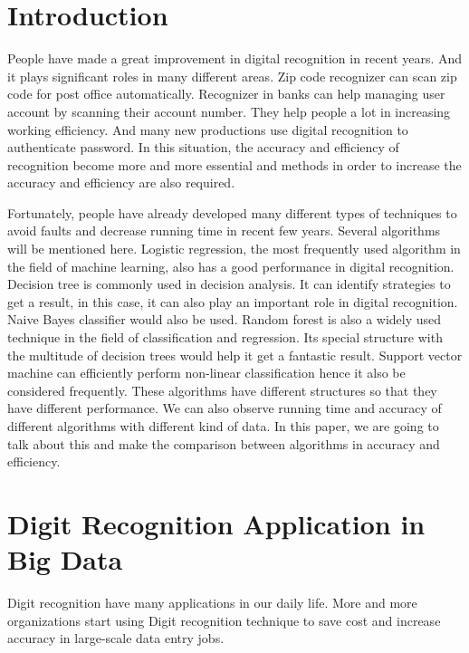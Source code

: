 \documentclass[sigconf]{acmart}
\begin{document}


\maketitle



\section{Introduction}

People have made a great improvement in digital recognition in recent years. And it plays significant roles in many different areas. Zip code recognizer can scan zip code for post office automatically. Recognizer in banks can help managing user account by scanning their account number. They help people a lot in increasing working efficiency. And many new productions use digital recognition to authenticate password. In this situation, the accuracy and efficiency of recognition become more and more essential and methods in order to increase the accuracy and efficiency are also required.

Fortunately, people have already developed many different types of techniques to avoid faults and decrease running time in recent few years. Several algorithms will be mentioned here. Logistic regression, the most frequently used algorithm in the field of machine learning, also has a good performance in digital recognition. Decision tree is commonly used in decision analysis. It can identify strategies to get a result, in this case, it can also play an important role in digital recognition. Naive Bayes classifier would also be used. Random forest is also a widely used technique in the field of classification and regression. Its special structure with the multitude of decision trees would help it get a fantastic result. Support vector machine can efficiently perform non-linear classification hence it also be considered frequently. These algorithms have different structures so that they have different performance. We can also observe running time and accuracy of different algorithms with different kind of data. In this paper, we are going to talk about this and make the comparison between algorithms in accuracy and efficiency.

\section{Digit Recognition Application in Big Data}
Digit recognition have many applications in our daily life. More and more organizations start using Digit recognition technique to save cost and increase accuracy in large-scale data entry jobs.
\end{document}
